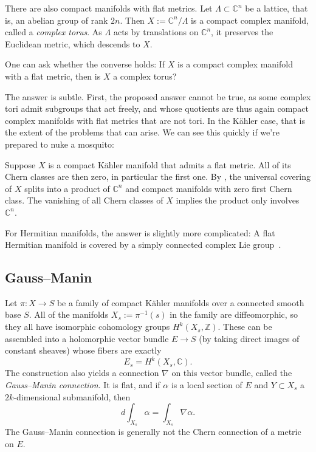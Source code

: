 \documentclass[11pt]{article}
\newcommand{\kk}[1]{\mathbb{#1}}
\begin{document}
There are also compact manifolds with flat metrics. Let $\Lambda \subset \kk C^n$ be a lattice, that is, an abelian group of rank $2n$. Then $X := \kk C^n / \Lambda$ is a compact complex manifold, called a \emph{complex torus}. As $\Lambda$ acts by translations on $\kk C^n$, it preserves the Euclidean metric, which descends to $X$.

One can ask whether the converse holds: If $X$ is a compact complex manifold with a flat metric, then is $X$ a complex torus?

The answer is subtle. First, the proposed answer cannot be true, as some complex tori admit subgroups that act freely, and whose quotients are thus again compact complex manifolds with flat metrics that are not tori. In the K\"ahler case, that is the extent of the problems that can arise. We can see this quickly if we're prepared to nuke a mosquito:

Suppose $X$ is a compact K\"ahler manifold that admits a flat metric. All of its Chern classes are then zero, in particular the first one. By \cite{beauville1983}, the universal covering of $X$ splits into a product of $\kk C^n$ and compact manifolds with zero first Chern class. The vanishing of all Chern classes of $X$ implies the product only involves $\kk C^n$.

For Hermitian manifolds, the answer is slightly more complicated: A flat Hermitian manifold is covered by a simply connected complex Lie group~\cite{boothby1958}.


\subsection{Gauss--Manin}


Let $\pi : X \to S$ be a family of compact K\"ahler manifolds over a connected smooth base $S$. All of the manifolds $X_s := \pi^{-1}(s)$ in the family are diffeomorphic, so they all have isomorphic cohomology groups $H^k(X_s, \kk Z)$. These can be assembled into a holomorphic vector bundle $E \to S$ (by taking direct images of constant sheaves) whose fibers are exactly
$$
E_s = H^k(X_s, \kk C).
$$
The construction also yields a connection $\nabla$ on this vector bundle, called the \emph{Gauss--Manin connection}. It is flat, and if $\alpha$ is a local section of $E$ and $Y \subset X_s$ a $2k$-dimensional submanifold, then
$$
d \! \int_{X_s}\!\!\!\! \alpha = \int_{X_s} \!\!\! \nabla \alpha.
$$
The Gauss--Manin connection is generally not the Chern connection of a metric on $E$.
\end{document}

